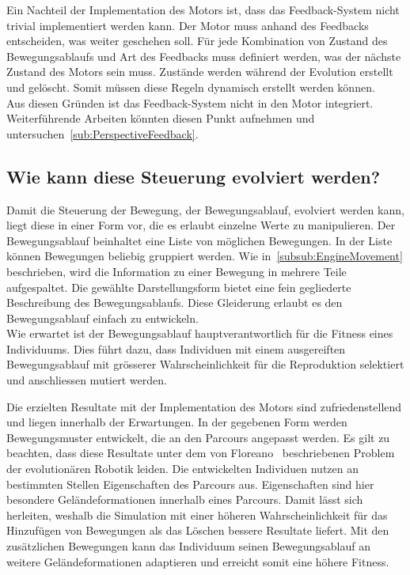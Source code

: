       \smallskip

      Ein Nachteil der Implementation des Motors ist, dass das Feedback-System nicht trivial implementiert werden kann.
      Der Motor muss anhand des Feedbacks entscheiden, was weiter geschehen soll.
      Für jede Kombination von Zustand des Bewegungsablaufs und Art des Feedbacks muss definiert werden,
      was der nächste Zustand des Motors sein muss.
      Zustände werden während der Evolution erstellt und gelöscht.
      Somit müssen diese Regeln dynamisch erstellt werden können.
      \\
      Aus diesen Gründen ist das Feedback-System nicht in den Motor integriert.
      Weiterführende Arbeiten könnten diesen Punkt aufnehmen und untersuchen~\vref{sub:PerspectiveFeedback}.

    \subsection{Wie kann diese Steuerung evolviert werden?\label{sub:wieStEv}}

      Damit die Steuerung der Bewegung, der Bewegungsablauf, evolviert werden kann, liegt diese in einer Form vor,
      die es erlaubt einzelne Werte zu manipulieren.
      Der Bewegungsablauf beinhaltet eine Liste von möglichen Bewegungen.
      In der Liste können Bewegungen beliebig gruppiert werden.
      Wie in~\vref{subsub:EngineMovement} beschrieben,
      wird die Information zu einer Bewegung in mehrere Teile aufgespaltet.
      Die gewählte Darstellungsform bietet eine fein gegliederte Beschreibung des Bewegungsablaufs.
      Diese Gleiderung erlaubt es den Bewegungsablauf einfach zu entwickeln.
      \\
      Wie erwartet ist der Bewegungsablauf hauptverantwortlich für die Fitness eines Individuums.
      Dies führt dazu, dass Individuen mit einem ausgereiften Bewegungsablauf mit grösserer Wahrscheinlichkeit
      für die Reproduktion selektiert und anschliessen mutiert werden.

      \smallskip

      Die erzielten Resultate mit der Implementation des Motors sind zufriedenstellend und
      liegen innerhalb der Erwartungen.
      In der gegebenen Form werden Bewegungsmuster entwickelt, die an den Parcours angepasst werden.
      Es gilt zu beachten, dass diese Resultate unter dem von Floreano~\cite{Floreano2010} beschriebenen Problem
      der evolutionären Robotik leiden.
      Die entwickelten Individuen nutzen an bestimmten Stellen Eigenschaften des Parcours aus.
      Eigenschaften sind hier besondere Geländeformationen innerhalb eines Parcours.
      Damit lässt sich herleiten, weshalb die Simulation mit einer höheren Wahrscheinlichkeit
      für das Hinzufügen von Bewegungen als das Löschen bessere Resultate liefert.
      Mit den zusätzlichen Bewegungen kann das Individuum seinen Bewegungsablauf
      an weitere Geländeformationen adaptieren und erreicht somit eine höhere Fitness.

